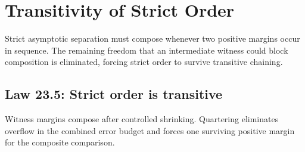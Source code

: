\documentclass[11pt,a4paper]{book}
\begin{document}
\section{Transitivity of Strict Order}

Strict asymptotic separation must compose whenever two positive margins occur in sequence. The remaining freedom that an intermediate witness could block composition is eliminated, forcing strict order to survive transitive chaining.

\subsection*{Law 23.5: Strict order is transitive}

Witness margins compose after controlled shrinking. Quartering eliminates overflow in the combined error budget and forces one surviving positive margin for the composite comparison.
\end{document}
